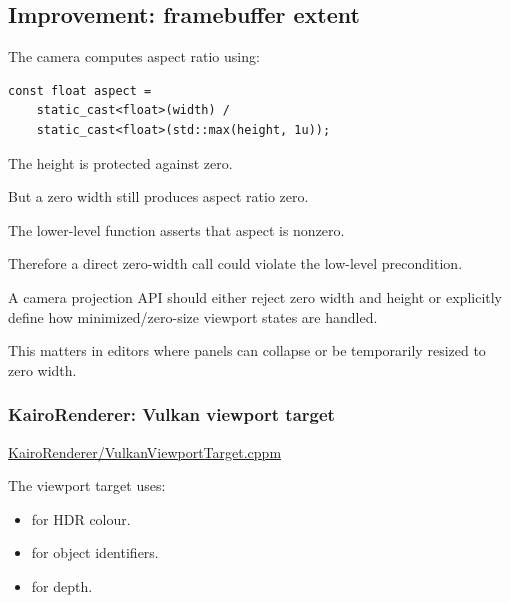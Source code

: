 \subsection{Improvement: framebuffer extent}\label{02-foundations-ii-ch037-improvement-framebuffer-extent}

\hypertarget{02-foundations-ii-ch037-improvement-framebuffer-extent}{}

The camera computes aspect ratio using:

\begin{verbatim}
const float aspect =
    static_cast<float>(width) /
    static_cast<float>(std::max(height, 1u));
\end{verbatim}

The height is protected against zero.

But a zero width still produces aspect ratio zero.

The lower-level  function asserts that aspect is nonzero.

Therefore a direct zero-width call could violate the low-level precondition.

A camera projection API should either reject zero width and height or explicitly define how minimized/zero-size viewport states are handled.

This matters in editors where panels can collapse or be temporarily resized to zero width.

\subsubsection{KairoRenderer: Vulkan viewport target}\label{02-foundations-ii-ch037-kairorenderer-vulkan-viewport-target}

\hypertarget{02-foundations-ii-ch037-kairorenderer-vulkan-viewport-target}{}

\href{https://github.com/swayam8624/KairoRenderer/blob/main/VulkanViewportTarget.cppm?utm_source=chatgpt.com}{KairoRenderer/VulkanViewportTarget.cppm}

The viewport target uses:

\begin{itemize}
\tightlist
\item
   for HDR colour.
\item
   for object identifiers.
\item
   for depth.
\end{itemize}

